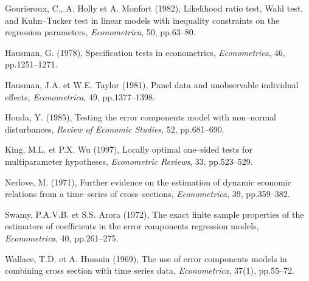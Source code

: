 \documentclass[a4paper]{article}
\begin{document}
  Gourieroux, C., A. Holly et A. Monfort (1982), Likelihood ratio test,
  Wald test, and Kuhn--Tucker test in linear models with inequality
  constraints on the regression parameters, \emph{Econometrica}, 50,
  pp.63--80.

  Hausman, G. (1978), Specification tests in econometrics,
  \emph{Econometrica}, 46, pp.1251--1271.

  Hausman, J.A. et W.E. Taylor (1981), Panel data and unobservable
  individual effects, \emph{Econometrica}, 49, pp.1377--1398.
  
  Honda, Y. (1985), Testing the error components model with non--normal
  disturbances, \emph{Review of Economic Studies}, 52, pp.681--690.

  King, M.L. et P.X. Wu (1997), Locally optimal one--sided tests for
  multiparameter hypotheses, \emph{Econometric Reviews}, 33,
  pp.523--529.

  Nerlove, M. (1971), Further evidence on the estimation of dynamic
  economic relations from a time--series of cross--sections,
  \emph{Econometrica}, 39, pp.359--382.

  Swamy, P.A.V.B. et S.S. Arora (1972), The exact finite sample
  properties of the estimators of coefficients in the error components
  regression models, \emph{Econometrica}, 40, pp.261--275.

  Wallace, T.D. et A. Hussain (1969), The use of error components
  models in combining cross section with time series data,
  \emph{Econometrica}, 37(1), pp.55--72.
\end{document}
